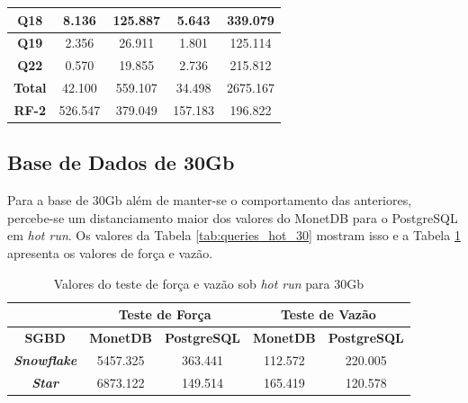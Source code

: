 \begin{table}[t]
\begin{tabular}{|c|c|c|c|c|}
        \textbf{Q18}   & 8.136             & 125.887             & 5.643            & 339.079             \\ \hline
        \textbf{Q19}   & 2.356             & 26.911              & 1.801            & 125.114             \\ \hline
        \textbf{Q22}   & 0.570             & 19.855              & 2.736            & 215.812             \\ \hline
        \textbf{Total} & 42.100            & 559.107             & 34.498           & 2675.167            \\ \hline
        \textbf{RF-2}  & 526.547           & 379.049             & 157.183          & 196.822             \\ \hline
        \end{tabular}
\end{table}

\subsection{Base de Dados de 30Gb}

Para a base de 30Gb além de manter-se o comportamento das anteriores, percebe-se um distanciamento maior dos valores do MonetDB para o PostgreSQL em \textit{hot run}. Os valores da Tabela \ref{tab:queries_hot_30} mostram isso e a Tabela \ref{tab:forca_vazao_hot_30} apresenta os valores de força e vazão.

\begin{table}[htpb]
        \centering
        \caption{Valores do teste de força e vazão sob \textit{hot run} para 30Gb}
        \label{tab:forca_vazao_hot_30}
        \begin{tabular}{|c|c|c|c|c|}
        \hline
                                & \multicolumn{2}{c|}{\textbf{Teste de Força}} & \multicolumn{2}{c|}{\textbf{Teste de Vazão}} \\ \hline
        \textbf{SGBD}      & \textbf{MonetDB}    & \textbf{PostgreSQL}    & \textbf{MonetDB}    & \textbf{PostgreSQL}    \\ \hline
        \textit{\textbf{Snowflake}} & 5457.325            & 363.441                & 112.572             & 220.005                \\ \hline
        \textit{\textbf{Star}}      & 6873.122            & 149.514                & 165.419             & 120.578                \\ \hline
        \end{tabular}
\end{table}

